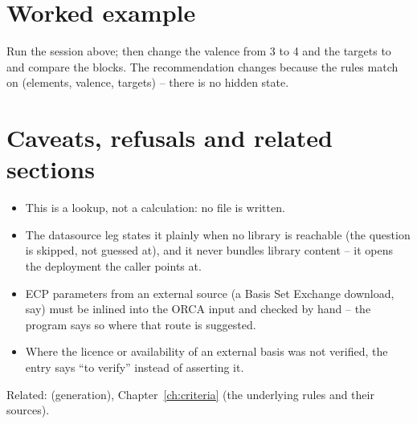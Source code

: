 \section{Worked example}

Run the session above; then change the valence from 3 to 4 and the targets to
 and compare the blocks. The recommendation changes because the
rules match on (elements, valence, targets) -- there is no hidden state.

\section{Caveats, refusals and related sections}

\begin{refusalbox}
\begin{itemize}
  \item This is a lookup, not a calculation: no file is written.
  \item The datasource leg states it plainly when no library is reachable
    (the question is skipped, not guessed at), and it never bundles library
    content -- it opens the deployment the caller points at.
  \item ECP parameters from an external source (a Basis Set Exchange download,
    say) must be inlined into the ORCA input and checked by hand -- the
    program says so where that route is suggested.
  \item Where the licence or availability of an external basis was not
    verified, the entry says ``to verify'' instead of asserting it.
\end{itemize}
\end{refusalbox}

Related:  (generation), Chapter~\ref{ch:criteria} (the underlying
rules and their sources).
